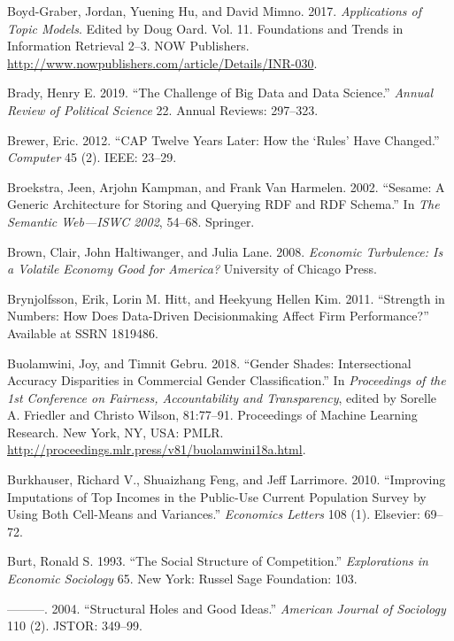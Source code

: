 \documentclass[]{krantz}
\begin{document}
\hypertarget{ref-boyd-graber-17}{}
Boyd-Graber, Jordan, Yuening Hu, and David Mimno. 2017.
\emph{Applications of Topic Models}. Edited by Doug Oard. Vol. 11.
Foundations and Trends in Information Retrieval 2--3. NOW Publishers.
\url{http://www.nowpublishers.com/article/Details/INR-030}.

\hypertarget{ref-brady2019challenge}{}
Brady, Henry E. 2019. ``The Challenge of Big Data and Data Science.''
\emph{Annual Review of Political Science} 22. Annual Reviews: 297--323.

\hypertarget{ref-brewer2012cap}{}
Brewer, Eric. 2012. ``CAP Twelve Years Later: How the `Rules' Have
Changed.'' \emph{Computer} 45 (2). IEEE: 23--29.

\hypertarget{ref-broekstra2002sesame}{}
Broekstra, Jeen, Arjohn Kampman, and Frank Van Harmelen. 2002. ``Sesame:
A Generic Architecture for Storing and Querying RDF and RDF Schema.'' In
\emph{The Semantic Web---ISWC 2002}, 54--68. Springer.

\hypertarget{ref-brown2008economic}{}
Brown, Clair, John Haltiwanger, and Julia Lane. 2008. \emph{Economic
Turbulence: Is a Volatile Economy Good for America?} University of
Chicago Press.

\hypertarget{ref-brynjolfsson2011strength}{}
Brynjolfsson, Erik, Lorin M. Hitt, and Heekyung Hellen Kim. 2011.
``Strength in Numbers: How Does Data-Driven Decisionmaking Affect Firm
Performance?'' Available at SSRN 1819486.

\hypertarget{ref-buolamwini2018}{}
Buolamwini, Joy, and Timnit Gebru. 2018. ``Gender Shades: Intersectional
Accuracy Disparities in Commercial Gender Classification.'' In
\emph{Proceedings of the 1st Conference on Fairness, Accountability and
Transparency}, edited by Sorelle A. Friedler and Christo Wilson,
81:77--91. Proceedings of Machine Learning Research. New York, NY, USA:
PMLR. \url{http://proceedings.mlr.press/v81/buolamwini18a.html}.

\hypertarget{ref-burkhauser2010improving}{}
Burkhauser, Richard V., Shuaizhang Feng, and Jeff Larrimore. 2010.
``Improving Imputations of Top Incomes in the Public-Use Current
Population Survey by Using Both Cell-Means and Variances.''
\emph{Economics Letters} 108 (1). Elsevier: 69--72.

\hypertarget{ref-burt1993social}{}
Burt, Ronald S. 1993. ``The Social Structure of Competition.''
\emph{Explorations in Economic Sociology} 65. New York: Russel Sage
Foundation: 103.

\hypertarget{ref-burt2004structural}{}
---------. 2004. ``Structural Holes and Good Ideas.'' \emph{American
Journal of Sociology} 110 (2). JSTOR: 349--99.
\end{document}
